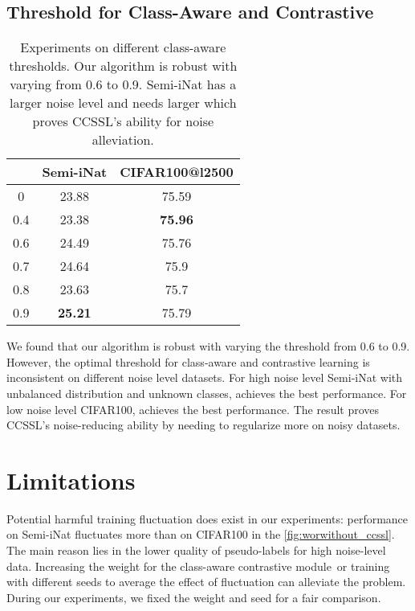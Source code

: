 \documentclass[10pt,twocolumn,letterpaper]{article}
\begin{document}
\subsection{Threshold for Class-Aware and Contrastive}
\begin{table}
\centering
\small
\begin{tabular}{c|c|c}
\toprule
 & Semi-iNat & CIFAR100@l2500 \\
\midrule
0 & 23.88 & 75.59 \\
0.4 & 23.38 & \textbf{75.96} \\
0.6 & 24.49 & 75.76 \\
0.7 & 24.64 & 75.9 \\
0.8 & 23.63 & 75.7 \\
0.9 & \textbf{25.21} & 75.79 \\
\bottomrule
\end{tabular}
\caption{Experiments on different class-aware thresholds. Our algorithm is robust with varying   from 0.6 to 0.9. Semi-iNat has a larger noise level and needs larger  which proves CCSSL's ability for noise alleviation.}
\label{tab:ablation-for-push}
\end{table}

We found that our algorithm is robust with varying the threshold  from 0.6 to 0.9. However, the optimal threshold for class-aware and contrastive learning is inconsistent on different noise level datasets. For high noise level Semi-iNat with unbalanced distribution and unknown classes,  achieves the best performance. For low noise level CIFAR100,  achieves the best performance. The result proves CCSSL's noise-reducing ability by needing to regularize more on noisy datasets. 

\section{Limitations}
Potential harmful training fluctuation does exist in our experiments: performance on Semi-iNat fluctuates more than on CIFAR100 in the \cref{fig:worwithout_ccssl}. The main reason lies in the lower quality of pseudo-labels for high noise-level data. Increasing the weight for the class-aware  contrastive module or training with different seeds to average the effect of fluctuation can alleviate the problem. During our experiments, we fixed the weight and seed for a fair comparison. 
\end{document}
